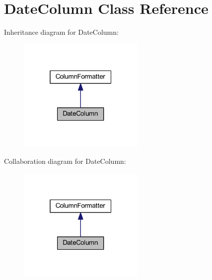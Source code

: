 \hypertarget{classhamburgscleanest_1_1_data_tables_1_1_models_1_1_column_formatters_1_1_date_column}{}\section{Date\+Column Class Reference}
\label{classhamburgscleanest_1_1_data_tables_1_1_models_1_1_column_formatters_1_1_date_column}


Inheritance diagram for Date\+Column\+:
\nopagebreak
\begin{figure}[H]
\begin{center}
\leavevmode
\includegraphics[width=172pt]{classhamburgscleanest_1_1_data_tables_1_1_models_1_1_column_formatters_1_1_date_column__inherit__graph}
\end{center}
\end{figure}


Collaboration diagram for Date\+Column\+:
\nopagebreak
\begin{figure}[H]
\begin{center}
\leavevmode
\includegraphics[width=172pt]{classhamburgscleanest_1_1_data_tables_1_1_models_1_1_column_formatters_1_1_date_column__coll__graph}
\end{center}
\end{figure}
